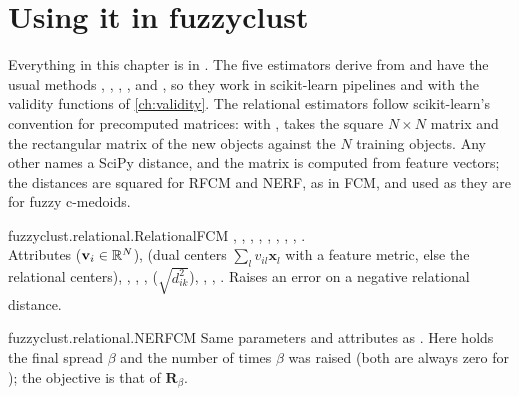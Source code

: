 \section{Using it in fuzzyclust}\label{sec:rel:api}

Everything in this chapter is in . The five estimators derive from  and have the usual methods , , , , and , so they work in scikit-learn pipelines and with the validity functions of \cref{ch:validity}. The relational estimators follow scikit-learn's convention for precomputed matrices: with ,  takes the square $N\times N$ matrix and  the rectangular matrix of the new objects against the $N$ training objects. Any other  names a SciPy distance, and the matrix is computed from feature vectors; the distances are squared for RFCM and NERF, as in FCM, and used as they are for fuzzy c-medoids.

\begin{apibox}{fuzzyclust.relational.RelationalFCM}
, , , , , , , , .\\
Attributes  ($\mathbf{v}_i\in\mathbb{R}^N$),  (dual centers $\sum_l v_{il}\mathbf{x}_l$ with a feature metric, else the relational centers), , , ,  ($\sqrt{d^2_{ik}}$), , , . Raises an error on a negative relational distance.
\end{apibox}

\begin{apibox}{fuzzyclust.relational.NERFCM}
Same parameters and attributes as . Here  holds the final spread $\beta$ and  the number of times $\beta$ was raised (both are always zero for ); the objective is that of $\mathbf{R}_\beta$.
\end{apibox}


